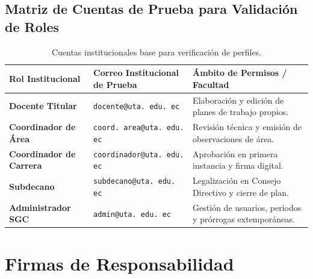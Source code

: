\documentclass[12pt,a4paper]{article}
\begin{document}
\subsection{Matriz de Cuentas de Prueba para Validación de Roles}
\begin{table}[H]
\centering
\small
\renewcommand{\arraystretch}{1.2}
\begin{tabularx}{\textwidth}{|>{\hsize=0.9\hsize\raggedright\arraybackslash\bfseries\footnotesize}X|>{\hsize=1.1\hsize\raggedright\arraybackslash\footnotesize}X|>{\hsize=1.0\hsize\raggedright\arraybackslash\footnotesize}X|}
\hline
\rowcolor{tableheader}
\textbf{Rol Institucional} & \textbf{Correo Institucional de Prueba} & \textbf{Ámbito de Permisos / Facultad} \\
\hline
Docente Titular & \texttt{docente@uta. edu. ec} & Elaboración y edición de planes de trabajo propios. \\
\hline
Coordinador de Área & \texttt{coord. area@uta. edu. ec} & Revisión técnica y emisión de observaciones de área. \\
\hline
Coordinador de Carrera & \texttt{coordinador@uta. edu. ec} & Aprobación en primera instancia y firma digital. \\
\hline
Subdecano & \texttt{subdecano@uta. edu. ec} & Legalización en Consejo Directivo y cierre de plan. \\
\hline
Administrador SGC & \texttt{admin@uta. edu. ec} & Gestión de usuarios, periodos y prórrogas extemporáneas. \\
\hline
\end{tabularx}
\caption{Cuentas institucionales base para verificación de perfiles.}
\end{table}

\section{Firmas de Responsabilidad}
\end{document}

